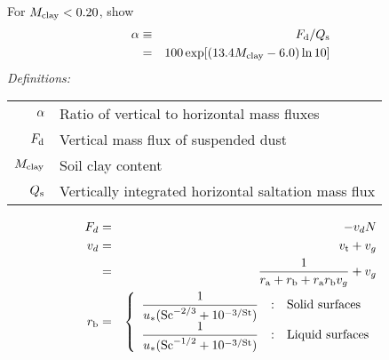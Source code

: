 \documentclass[final,dvips]{foils}
\begin{document}



\rotatefoilhead{\bgl
\Large\textcolor{blue}{\hfill Vertical Mass Flux \hfill}}\vspace{-0.5in}\large
For $\mssfrccly < 0.20$, \cite{MaB95} show 
\begin{eqnarray}
\alpha & \equiv & F_{\mathrm{d}} / Q_{\mathrm{s}} \nonumber \\ 
& = & 100 \exp [ ( 13.4 M_{\mathrm{clay}} - 6.0 ) \ln 10 ]
\label{eqn:hrz_vrt_prp_fct_MaB95_2}
\end{eqnarray}
\emph{Definitions:}
\begin{table}
\begin{tabular}{ >{$}r<{$} l}
\hrzvrtprpfct & Ratio of vertical to horizontal mass fluxes \\[0.5ex]
\flxmssvrtdst & Vertical mass flux of suspended dust \\[0.5ex]
\mssfrccly & Soil clay content \\[0.5ex]
\flxmsshrzslt & Vertically integrated horizontal saltation mass flux \\[0.5ex]
\end{tabular}
\end{table}

\rotatefoilhead{\bgl
\Large\textcolor{blue}{\hfill Dry Deposition Parameterization \hfill}}\vspace{-0.5in}\large
\begin{eqnarray}
\flxdps & = & - \vlcdps \cnc \\ %
\label{eqn:flx_dps_dfn}
\vlcdps & = & \vlctrb + \vlcgrv \nonumber \\
\label{eqn:vlc_dps_dfn}
& = & \frac{1}{\rssaer + \rsslmn + \rssaer \rsslmn \vlcgrv } + \vlcgrv \\
\label{eqn:rss_dps_dfn}
\rsslmn & = & \left\{
\begin{array}{ >{\displaystyle}l<{} @{\quad:\quad}l}
\frac{ 1}{\wndfrc ( \shmnbr^{-2/3} + 10^{-3/\stknbr} ) } & \mbox{Solid surfaces} \\
\frac{ 1}{\wndfrc ( \shmnbr^{-1/2} + 10^{-3/\stknbr} ) } & \mbox{Liquid surfaces}
\end{array} \right.
\label{eqn:rss_lmn_dfn}
\end{eqnarray}
\end{document}
